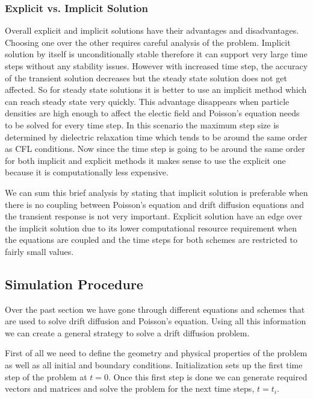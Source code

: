 \subsubsection{Explicit vs. Implicit Solution}

Overall explicit and implicit solutions have their advantages and disadvantages. Choosing one over the other requires careful analysis of the problem. Implicit solution by itself is unconditionally stable therefore it can support very large time steps without any stability issues. However with increased time step, the accuracy of the transient solution decreases but the steady state solution does not get affected. So for steady state solutions it is better to use an implicit method which can reach steady state very quickly. This advantage disappears when particle densities are high enough to affect the electic field and Poisson's equation needs to be solved for every time step. In this scenario the maximum step size is determined by dielectric relaxation time which tends to be around the same order as CFL conditions. Now since the time step is going to be around the same order for both implicit and explicit methods it makes sense to use the explicit one because it is computationally less expensive.

We can sum this brief analysis by stating that implicit solution is preferable when there is no coupling between Poisson's equation and drift diffusion equations and the transient response is not very important. Explicit solution have an edge over the implicit solution due to its lower computational resource requirement when the equations are coupled and the time steps for both schemes are restricted to fairly small values. 

\clearpage
\subsection{Simulation Procedure}
Over the past section we have gone through different equations and schemes that are used to solve drift diffusion and Poisson's equation. Using all this information we can create a general strategy to solve a drift diffusion problem. 

First of all we need to define the geometry and physical properties of the problem as well as all initial and boundary conditions. Initialization sets up the first time step of the problem at $t=0$. Once this first step is done we can generate required vectors and matrices and solve the problem for the next time steps, $t=t_i$. 

